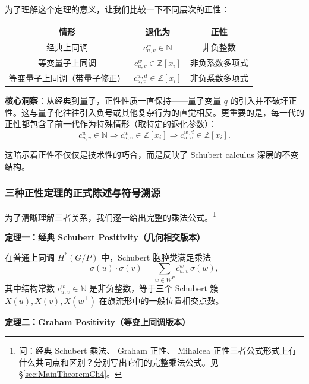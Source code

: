 为了理解这个定理的意义，让我们比较一下不同层次的正性：

\begin{center}
\begin{tabular}{c|c|c}
情形 & 退化为 & 正性 \\ \hline
经典上同调 & $c_{u,v}^w \in \mathbb{N}$ & 非负整数 \\
等变量子上同调 & $c_{u,v}^w \in \mathbb{Z}[x_i]$ & 非负系数多项式 \\
等变量子上同调（带量子修正） & $c_{u,v}^{w,d} \in \mathbb{Z}[x_i]$ & 非负系数多项式
\end{tabular}
\end{center}

\textbf{核心洞察}：从经典到量子，正性性质一直保持——量子变量 $q$ 的引入并不破坏正性。这与量子化往往引入负号或其他复杂行为的直觉相反。更重要的是，每一代的正性都包含了前一代作为特殊情形（取特定的退化参数）：
$$c_{u,v}^w \in \mathbb{N} \Longrightarrow c_{u,v}^w \in \mathbb{Z}[x_i] \Longrightarrow c_{u,v}^{w,d} \in \mathbb{Z}[x_i].$$

这暗示着正性不仅仅是技术性的巧合，而是反映了 Schubert calculus 深层的不变结构。

\subsubsection{三种正性定理的正式陈述与符号溯源}

为了清晰理解三者关系，我们逐一给出完整的乘法公式。\footnote{问：经典 Schubert 乘法、 Graham 正性、 Mihalcea 正性三者公式形式上有什么共同点和区别？分别写出它们的完整乘法公式。见 \S\ref{sec:MainTheoremCh4}。}

\smallskip
\noindent\textbf{定理一：经典 Schubert Positivity（几何相交版本）}

\begin{Theorem}
\label{th:ClassicalSchubertPositivity}
在普通上同调 $H^*(G/P)$ 中，Schubert 胞腔类满足乘法
\begin{equation}
\label{eq:ClassicalSchubertProduct}
\sigma(u) \cdot \sigma(v) = \sum_{w \in W^P} c_{u,v}^w \, \sigma(w),
\end{equation}
其中结构常数 $c_{u,v}^w \in \mathbb{N}$ 是非负整数，等于三个 Schubert 簇 $X(u), X(v), X(w^\perp)$ 在旗流形中的一般位置相交点数。
\end{Theorem}

\smallskip
\noindent\textbf{定理二：Graham Positivity（等变上同调版本）}

